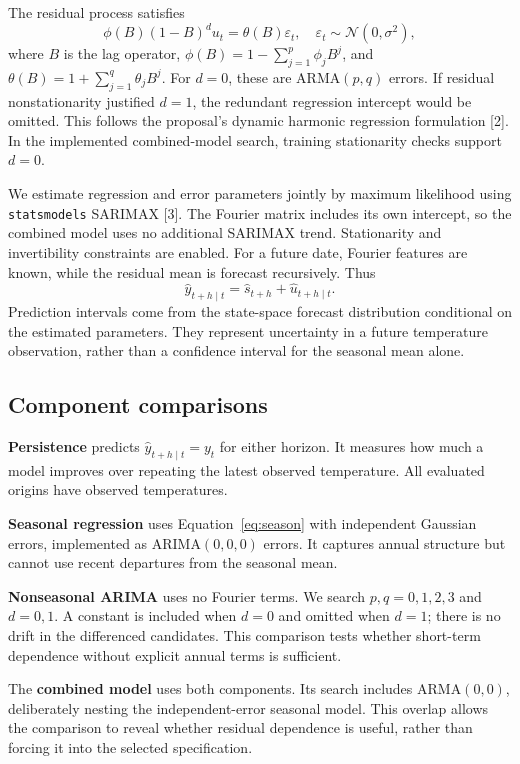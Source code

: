 \documentclass{article}
\begin{document}
The residual process satisfies
\begin{equation}
\phi(B)(1-B)^d u_t=\theta(B)\varepsilon_t,
\quad \varepsilon_t\sim\mathcal{N}(0,\sigma^2),
\end{equation}
where $B$ is the lag operator,
$\phi(B)=1-\sum_{j=1}^{p}\phi_jB^j$, and
$\theta(B)=1+\sum_{j=1}^{q}\theta_jB^j$.
For $d=0$, these are ARMA$(p,q)$ errors. If residual nonstationarity justified
$d=1$, the redundant regression intercept would be omitted. This follows the
proposal's dynamic harmonic regression formulation [2]. In the implemented
combined-model search, training stationarity checks support $d=0$.

We estimate regression and error parameters jointly by maximum likelihood using
\texttt{statsmodels} SARIMAX [3]. The Fourier matrix includes its own intercept,
so the combined model uses no additional SARIMAX trend. Stationarity and
invertibility constraints are enabled. For a future date, Fourier features are
known, while the residual mean is forecast recursively. Thus
\begin{equation}
\widehat y_{t+h\mid t}=\widehat s_{t+h}+\widehat u_{t+h\mid t}.
\end{equation}
Prediction intervals come from the state-space forecast distribution conditional
on the estimated parameters. They represent uncertainty in a future temperature
observation, rather than a confidence interval for the seasonal mean alone.

\subsection{Component comparisons}
\textbf{Persistence} predicts $\widehat y_{t+h\mid t}=y_t$ for either horizon.
It measures how much a model improves over repeating the latest observed
temperature. All evaluated origins have observed temperatures.

\textbf{Seasonal regression} uses Equation~\ref{eq:season} with independent
Gaussian errors, implemented as ARIMA$(0,0,0)$ errors. It captures annual
structure but cannot use recent departures from the seasonal mean.

\textbf{Nonseasonal ARIMA} uses no Fourier terms. We search $p,q=0,1,2,3$
and $d=0,1$. A constant is included when $d=0$ and omitted when $d=1$;
there is no drift in the differenced candidates. This comparison tests whether
short-term dependence without explicit annual terms is sufficient.

The \textbf{combined model} uses both components. Its search includes
ARMA$(0,0)$, deliberately nesting the independent-error seasonal model.
This overlap allows the comparison to reveal whether residual dependence is
useful, rather than forcing it into the selected specification.
\end{document}
